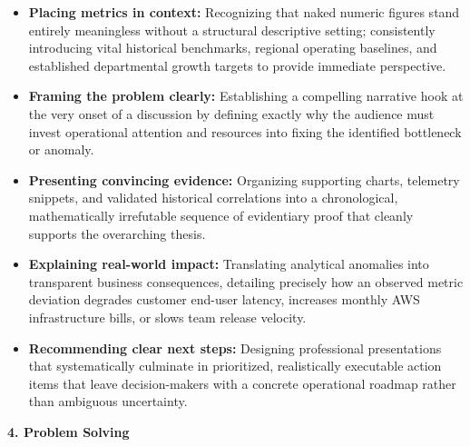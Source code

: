 \begin{itemize}
\tightlist
\item
  \textbf{Placing metrics in context:} Recognizing that naked numeric
  figures stand entirely meaningless without a structural descriptive
  setting; consistently introducing vital historical benchmarks,
  regional operating baselines, and established departmental growth
  targets to provide immediate perspective.
\item
  \textbf{Framing the problem clearly:} Establishing a compelling
  narrative hook at the very onset of a discussion by defining exactly
  why the audience must invest operational attention and resources into
  fixing the identified bottleneck or anomaly.
\item
  \textbf{Presenting convincing evidence:} Organizing supporting charts,
  telemetry snippets, and validated historical correlations into a
  chronological, mathematically irrefutable sequence of evidentiary
  proof that cleanly supports the overarching thesis.
\item
  \textbf{Explaining real-world impact:} Translating analytical
  anomalies into transparent business consequences, detailing precisely
  how an observed metric deviation degrades customer end-user latency,
  increases monthly AWS infrastructure bills, or slows team release
  velocity.
\item
  \textbf{Recommending clear next steps:} Designing professional
  presentations that systematically culminate in prioritized,
  realistically executable action items that leave decision-makers with
  a concrete operational roadmap rather than ambiguous uncertainty.
\end{itemize}

\vspace{0.5em}\noindent\textbf{4. Problem Solving}\par

